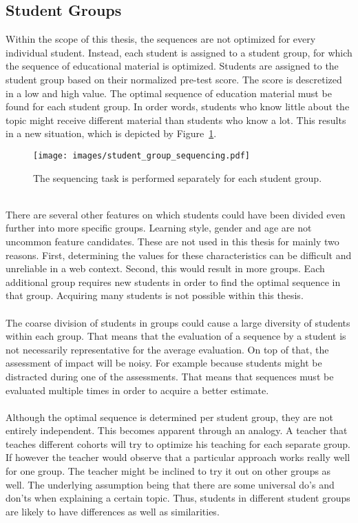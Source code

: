 \subsection{Student Groups}
\label{sec:task_student_groups}
Within the scope of this thesis, the sequences are not optimized for every
individual student. Instead, each student is assigned to a student group, for
which the sequence of educational material is optimized. Students are assigned
to the student group based on their normalized pre-test score. The score is
descretized in a low and high value.  The optimal sequence of education
material must be found for each student group. In order words, students
who know little about the topic might receive different material than students
who know a lot. This results in a new situation, which is depicted by
Figure~\ref{fig:student_group_sequencing}.\\
\begin{figure}[ht]
	\centering
	\texttt{[image: images/student\_group\_sequencing.pdf]}
	\caption[Educational context of the task with student groups]{The
	sequencing task is performed separately for each student group.}
	\label{fig:student_group_sequencing}
\end{figure}\\
\noindent
There are several other features on which students could have been
divided even further into more specific groups. Learning style, gender and age
are not uncommon feature candidates. These are not used in this thesis for
mainly two reasons. First, determining the values for these characteristics can
be difficult and unreliable in a web context. Second, this would result in more
groups. Each additional group requires new students in order to find the
optimal sequence in that group. Acquiring many students is not possible within
this thesis.\\\\
\noindent
The coarse division of students in groups could cause a large diversity of
students within each group. That means that the evaluation of a sequence by a
student is not necessarily representative for the average evaluation. On top of
that, the assessment of impact will be noisy. For example because students
might be distracted during one of the assessments. That means that sequences
must be evaluated multiple times in order to acquire a better estimate.\\\\
\noindent
Although the optimal sequence is determined per student group, they are not
entirely independent. This becomes apparent through an analogy. A teacher that
teaches different cohorts will try to optimize his teaching for each
separate group. If however the teacher would observe that a particular approach
works really well for one group. The teacher might be inclined to
try it out on other groups as well. The underlying assumption being
that there are some universal do's and don'ts when explaining a certain topic.
Thus, students in different student groups are likely to have differences as
well as similarities.

